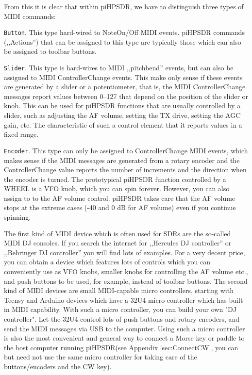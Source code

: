 \documentclass[12pt]{book}
\def\rett#1{\texttt{\color{red}#1}}
\def\pH{pi\-HPSDR\xspace}
\begin{document}
From this it is clear that within \pH, we have to distinguish three types
of MIDI commands:

\rett{Button}. This type hard-wired to NoteOn/Off MIDI events. \pH commands (,,Actions'') that
can be assigned to this type are typically those which can also be assigned to toolbar
buttons.

\rett{Slider}. This type is hard-wires to MIDI ,,pitchbend'' events, but can also be assigned
to MIDI ControllerChange events. This make only sense if these events are generated
by a slider or a potentiometer, that is, the MIDI ControllerChange messages report
values between 0--127 that depend on the position of the slider or knob.
This can be used
for \pH functions that are usually controlled by a slider, such as adjusting the AF
volume, setting the TX drive, setting the AGC gain, etc. The characteristic of such
a control element that it reports values in a fixed range.

\rett{Encoder}. This type can only be assigned to  ControllerChange MIDI events,
which makes sense if the MIDI messages are generated from a rotary encoder
and the ControllerChange value reports the number of increments and
the direction when the encoder is turned.
The prototypical \pH
function controlled by a WHEEL is a VFO knob, which you can spin forever. However,
you can also assign to to the AF volume control. \pH takes care that the
AF volume stops at the extreme cases (-40 and 0 dB for AF volume) even if you continue
spinning.

The first kind of MIDI device which is often used for SDRs are the so-called MIDI DJ
consoles. If you search the internet for ,,Hercules DJ controller'' or ,,Behringer
DJ controller'' you will find lots of examples. For a very decent price, you
can obtain a device which features lots of controls which you can conveniently use
as VFO knobs, smaller knobs for controlling the AF volume etc., and push buttons
to be used, for example, instead of toolbar buttons. The second kind of MIDI devices
are small MIDI-capable micro controllers, starting with Teensy and Arduino devices
which have a 32U4 micro controller which has built-in MIDI capability. With such a
micro controller, you can build your own "DJ controller". Let the 32U4 control
lots of push buttons and rotary encoders, and send the MIDI messages via USB to the
computer. Using such a micro controller is also the most convenient and general way
to connect a Morse key or paddle to the host computer running \pH (see
Appendix \ref{sec:ConnectCW}, you can but need not use the same micro controller
for taking care of the buttons/encoders and the CW key).
\end{document}

